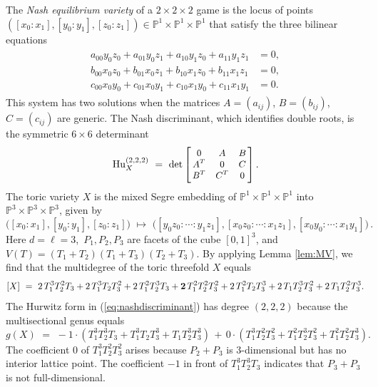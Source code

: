 \documentclass[12pt]{article}
\theoremstyle{definition}
\newenvironment{example}
{\pushQED{\qed}\renewcommand{\qedsymbol}{$\diamond$}\examplex}
{\popQED\endexamplex}
\newcommand{\bP}{\mathbb P}
\begin{document}
\begin{example} \label{ex:222game}
 The {\em Nash equilibrium variety} of a $2\times 2\times 2$ game is the locus of points $([x_0:x_1],[y_0:y_1],[z_0:z_1])\in\bP^1\times\bP^1\times\bP^1$ that satisfy the three bilinear equations
\begin{align}\label{eq: tmNe 2x2x2 game}
    \begin{split}
        a_{00}y_0z_0+a_{01}y_0z_1+a_{10}y_1z_0+a_{11}y_1z_1 &= 0,\\
        b_{00}x_0z_0+b_{01}x_0z_1+b_{10}x_1z_0+b_{11}x_1z_1 &= 0,\\
        c_{00}x_0y_0+c_{01}x_0y_1+c_{10}x_1y_0+c_{11}x_1y_1 &= 0.
    \end{split}
\end{align}
This system has two solutions when the matrices $A=(a_{ij})$, $B=(b_{ij})$, $C=(c_{ij})$ are generic.
The Nash discriminant, which identifies double roots,
is the symmetric $6 \times 6$ determinant
\begin{equation}
\label{eq:nashdiscriminant}
    {\rm Hu}_X^{(2,2,2)} \,\, = \,\,
    {\rm det}\begin{small}
    \begin{bmatrix}
     \,   0 & A & B \, \\
     \,   A^T & 0 & C \,\\
      \,  B^T & C^T & 0\,
    \end{bmatrix}\end{small}.
\end{equation}
The toric variety $X$ is
the mixed Segre embedding of $\bP^1\!\times\!\bP^1\!\times\!\bP^1$ into 
$\bP^3 \!\times\! \bP^3\!\times \! \bP^3$, given by
\[
    \bigl([x_0:x_1],[y_0:y_1],[z_0:z_1] \bigr)\,\,\mapsto \,\,
    \bigl([y_0z_0:\cdots:y_1z_1],[x_0z_0:\cdots:x_1z_1],[x_0y_0:\cdots:x_1y_1] \bigr)\,.
\]
Here $d=\ell=3$, $\,P_1,P_2,P_3$ are facets of the cube $[0,1]^3$, and
$V(T) = (T_1+T_2)(T_1+T_3)(T_2+T_3)$.
By applying Lemma \ref{lem:MV}, we find that the multidegree of the toric threefold $X$ equals
\[
    [X] \,\, =\,\, 2\,T_{1}^{3}T_{2}^{2}T_{3}+2\,T_{1}^{3}T_{2}T_{3}^{2}+2\,T_{1}^{2}T_{2}^{3}T_{3}
    + {\bf 2}\,T_{1}^{2}T_{2}^{2}T_{3}^{2}+2\,T_{1}^{2}T_{2}T_{3}^{3}+2\,T_{1}T_{2}^{3}T_{3}^{2}+2\,T_{1}T_{2}^{2}T_{3}^{3}.
    \]
    The Hurwitz form in (\ref{eq:nashdiscriminant}) has degree $(2,2,2)$ because
the multisectional genus equals
 $$ g(X) \,\,=\,\, -1 \cdot (T_{1}^{3}T_{2}^{3}T_{3} + T_{1}^{3}T_{2}T_{3}^3 + T_{1}T_{2}^3 T_{3}^3 ) \,+\,
 0 \cdot (
T_{1}^{3}T_{2}^{2}T_{3}^{2}+T_{1}^{2}T_{2}^{3}T_{3}^{2}+T_{1}^{2}T_{2}^{2}T_{3}^{3}). $$
The coefficient $0$ of $T_{1}^{3}T_{2}^{2}T_{3}^{2}$ arises because $P_2+P_3$ is
$3$-dimensional but has no interior lattice point. The coefficient $-1$ in front of
$T_{1}^{3}T_{2}^{3}T_{3}$ indicates that $P_3+P_3$ is not full-dimensional.
\end{example}
\end{document}
